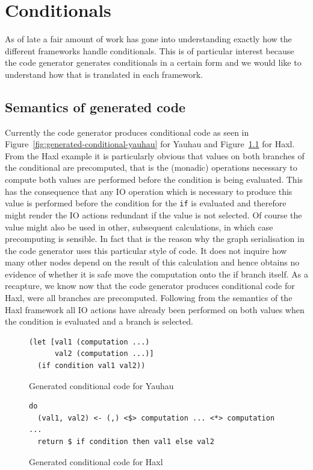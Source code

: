 \chapter{Conditionals}
\label{ch:Conditionals}


As of late a fair amount of work has gone into understanding exactly how the different frameworks handle conditionals.
This is of particular interest because the code generator generates conditionals in a certain form and we would like to understand how that is translated in each framework.

\section{Semantics of generated code}

Currently the code generator produces conditional code as seen in Figure~\ref{fig:generated-conditional-yauhau} for Yauhau and Figure~\ref{fig:generated-conditional-haxl} for Haxl.
From the Haxl example it is particularly obvious that values on both branches of the conditional are precomputed, that is the (monadic) operations necessary to compute both values are performed before the condition is being evaluated.
This has the consequence that any IO operation which is necessary to produce this value is performed before the condition for the \texttt{if} is evaluated and therefore might render the IO actions redundant if the value is not selected.
Of course the value might also be used in other, subsequent calculations, in which case precomputing is sensible.
In fact that is the reason why the graph serialisation in the code generator uses this particular style of code.
It does not inquire how many other nodes depend on the result of this calculation and hence obtains no evidence of whether it is safe move the computation onto the if branch itself.
As a recapture, we know now that the code generator produces conditional code for Haxl, were all branches are precomputed.
Following from the semantics of the Haxl framework all IO actions have already been performed on both values when the condition is evaluated and a branch is selected.

\begin{figure}
\begin{verbatim}
(let [val1 (computation ...)
      val2 (computation ...)]
  (if condition val1 val2))
\end{verbatim}
\caption{Generated conditional code for Yauhau}
\label{fig:generated-conditional-yauhau}
\begin{verbatim}
do
  (val1, val2) <- (,) <$> computation ... <*> computation ...
  return $ if condition then val1 else val2
\end{verbatim}
\caption{Generated conditional code for Haxl}
\label{fig:generated-conditional-haxl}
\end{figure}

